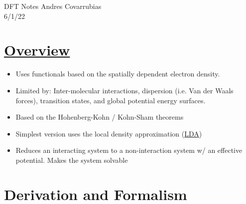 \documentclass[12pt]{article}
\begin{document}
\noindent DFT Notes \hfill Andres Covarrubias    \\
6/1/22

\hrulefill
\section*{\href{https://en.wikipedia.org/wiki/Density_functional_theory}{Overview}} %
\begin{itemize}
    \item Uses functionals based on the spatially dependent electron density.
    \item Limited by: Inter-molecular interactions, dispersion (i.e. Van der Waals forces), transition states, and global potential energy surfaces. 
    \item Based on the Hohenberg-Kohn / Kohn-Sham theorems
    \item Simplest version uses the local density approximation (\href{https://en.wikipedia.org/wiki/Local-density_approximation}{LDA})
    \item Reduces an interacting system to a non-interaction system w/ an effective potential. Makes the system solvable
\end{itemize}

\section*{Derivation and Formalism} %
\end{document}
